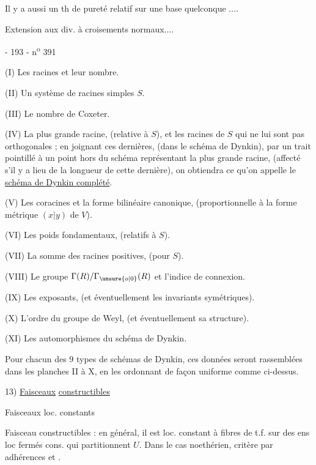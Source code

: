 Il y a aussi un th de pureté relatif sur une base quelconque ....


Extension aux div. à croisements normaux....

- 193 - \hfill n\textsuperscript{o} 391

(I) Les racines et leur nombre.

(II) Un système de racines simples $S$.

(III) Le nombre de Coxeter.

(IV) La plus grande racine, (relative à $S$), et les racines de $S$ qui ne lui sont pas orthogonales ; en joignant ces dernières, (dans le schéma de Dynkin), par un trait pointillé à un point hors du schéma représentant la plus grande racine, (affecté s'il y a lieu de la longueur de cette dernière), on obtiendra ce qu'on appelle le \uline{schéma de Dynkin complété}.

(V) Les coracines et la forme bilinéaire canonique, (proportionnelle à la forme métrique $(x|y)$ de $V$).

(VI) Les poids fondamentaux, (relatifs à $S$).

(VII) La somme des racines positives, (pour $S$).

(VIII) Le groupe $\Gamma(R)/\Gamma_{\unsure{o|0}}(R)$ et l'indice de connexion.

(IX) Les exposants, (et éventuellement les invariants symétriques).

(X) L'ordre du groupe de Weyl, (et éventuellement sa structure).

(XI) Les automorphismes du schéma de Dynkin.

Pour chacun des 9 types de schémas de Dynkin, ces données seront rassemblées dans les planches II à X, en les ordonnant de façon uniforme comme ci-dessus.

13) \uline{Faisceaux} \uline{constructibles}

Faisceaux loc.  constants

Faisceau constructibles : en général, il est loc. constant à fibres  de t.f. sur des ens loc fermés cons. qui partitionnent $U$. Dans le cas noethérien, critère par adhérences  et .

